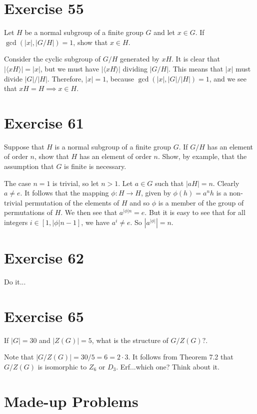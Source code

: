 \documentclass[12pt]{article}
\begin{document}
\section*{Exercise 55}

Let $H$ be a normal subgroup of a finite group $G$ and let $x\in G$.
If $\gcd(|x|,|G/H|)=1$, show that $x\in H$.

Consider the cyclic subgroup of $G/H$ generated by $xH$.
It is clear that $|\langle xH\rangle|=|x|$, but we must have
$|\langle xH\rangle|$ dividing $|G/H|$.  This means that
$|x|$ must divide $|G|/|H|$.  Therefore, $|x|=1$,
because $\gcd(|x|,|G|/|H|)=1$, and we see that
$xH=H\implies x\in H$.

\section*{Exercise 61}

Suppose that $H$ is a normal subgroup of a finite group $G$.
If $G/H$ has an element of order $n$, show that $H$ has an element of order $n$.
Show, by example, that the assumption that $G$ is finite is necessary.

The case $n=1$ is trivial, so let $n>1$.  Let $a\in G$ such that $|aH|=n$.  Clearly $a\neq e$.
It follows that the mapping $\phi:H\to H$, given by $\phi(h)=a^nh$ is a non-trivial permutation of
the elements of $H$ and so $\phi$ is a member of the group of permutations of $H$.
We then see that $a^{|\phi|n}=e$.  But it is easy to see that for all
integers $i\in [1,|\phi|n-1]$, we have $a^i\neq e$.  So $|a^{|\phi|}|=n$.

\section*{Exercise 62}

Do it...

\section*{Exercise 65}

If $|G|=30$ and $|Z(G)|=5$, what is the
structure of $G/Z(G)?$.

Note that $|G/Z(G)|=30/5=6=2\cdot 3$.
It follows from Theorem 7.2 that $G/Z(G)$
is isomorphic to $Z_6$ or $D_3$.  Erf...which one?
Think about it.

\section*{Made-up Problems}
\end{document}
